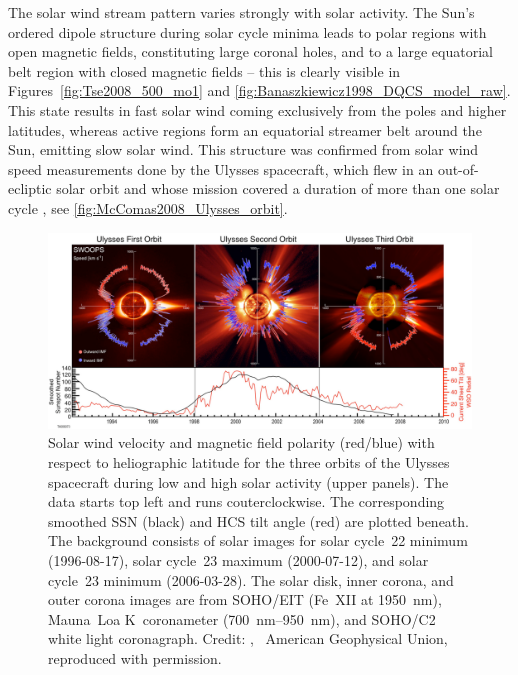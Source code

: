 The solar wind stream pattern varies strongly with solar activity. The Sun's ordered dipole structure during solar cycle minima leads to polar regions with open magnetic fields, constituting large coronal holes, and to a large equatorial belt region with closed magnetic fields -- this is clearly visible in Figures~\ref{fig:Tse2008_500_mo1} and \ref{fig:Banaszkiewicz1998_DQCS_model_raw}. This state results in fast solar wind coming exclusively from the poles and higher latitudes, whereas active regions form an equatorial streamer belt around the Sun, emitting slow solar wind. This structure was confirmed from solar wind speed measurements done by the Ulysses spacecraft, which flew in an out-of-ecliptic solar orbit and whose mission covered a duration of more than one solar cycle \citep{McComas200809}, see \autoref{fig:McComas2008_Ulysses_orbit}.
\begin{figure}[htb]
	\centering
	\includegraphics[width=\textwidth]{figures_of_others/images/McComas2008_Ulysses_orbit_.png}
	\caption[Credit: {\citet[Fig.~1]{McComas200809}}, \textcopyright~American Geophysical Union, reproduced with permission.]
	{Solar wind velocity and magnetic field polarity (red/blue) with respect to heliographic latitude for the three orbits of the Ulysses spacecraft during low and high solar activity (upper panels). The data starts top left and runs couterclockwise. The corresponding smoothed SSN (black) and HCS tilt angle (red) are plotted beneath. The background consists of solar images for solar cycle~22 minimum (1996-08-17), solar cycle~23 maximum (2000-07-12), and solar cycle~23 minimum (2006-03-28). The solar disk, inner corona, and outer corona images are from SOHO/EIT (Fe~XII at \SI{1950}{\nano\meter}), Mauna~Loa K~coronameter (\SIrange{700}{950}{\nano\meter}), and SOHO/C2 white light coronagraph. Credit: {\citet[Fig.~1]{McComas200809}}, \textcopyright~American Geophysical Union, reproduced with permission.}
	\label{fig:McComas2008_Ulysses_orbit}
\end{figure}
